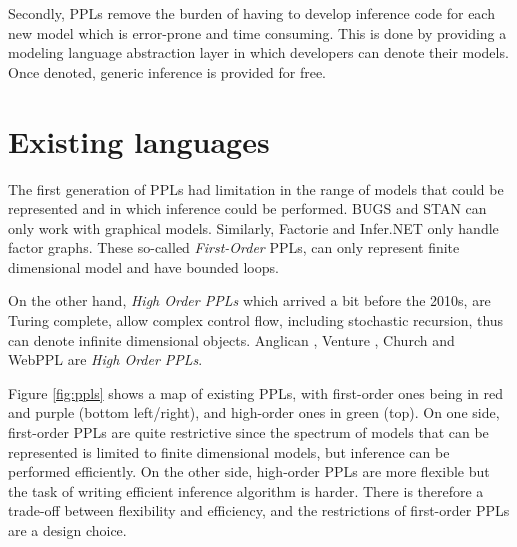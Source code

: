 Secondly, \glspl{PPL} remove the burden of having to develop inference code for each new model which is error-prone and time consuming.
This is done by providing a modeling language abstraction layer in which developers can denote their models.  Once denoted, generic inference is provided for free.

\section{Existing languages} \label{PPL_history}

The first generation of \glspl{PPL} had limitation in the range of models that could be represented and in which inference could be performed.
BUGS \cite{Bugs} and STAN \cite{Stan} can only work with graphical models.
Similarly, Factorie \cite{Factorie} and Infer.NET \cite{InferNET} only handle factor graphs.
These so-called \textit{First-Order} \gls{PPLs}, can only represent finite dimensional model and have bounded loops.

On the other hand, \textit{High Order \gls{PPLs}} which arrived a bit before the 2010s, are Turing complete, allow complex control flow, including stochastic recursion, thus can denote infinite dimensional objects.
Anglican \cite{wood-aistats-2014}, Venture \cite{Mansinghka:2014ty}, Church \cite{Goodman:2012uq} and WebPPL \cite{dippl} are \textit{High Order \gls{PPLs}}.


Figure \ref{fig:ppls} shows a map of existing \glspl{PPL}, with first-order ones being in red and purple (bottom left/right), and high-order ones in green (top).
On one side, first-order \glspl{PPL} are quite restrictive since the spectrum of models that can be represented is limited to finite dimensional models, but inference can be performed efficiently.
On the other side, high-order \glspl{PPL} are more flexible but the task of writing efficient inference algorithm is harder.
There is therefore a trade-off between flexibility and efficiency, and the restrictions of first-order \glspl{PPL} are a design choice.

